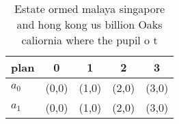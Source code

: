\documentclass[a4paper]{article}
\begin{document}
\begin{table}
\begin{adjustbox}{width=0.5\columnwidth}
\begin{tabular}{|l|l|l|l|l|}
\hline
\textbf{plan} & \multicolumn{1}{c|}{\textbf{0}} & \multicolumn{1}{c|}{\textbf{1}} & \multicolumn{1}{c|}{\textbf{2}} & \multicolumn{1}{c|}{\textbf{3}} \\ \hline
\textbf{$a_0$}  & (0,0) & (1,0) & (2,0) & (3,0) \\ \hline
\textbf{$a_1$}  & (0,0) & (1,0) & (2,0) & (3,0) \\ \hline
\end{tabular}
\end{adjustbox}
\caption{Estate ormed malaya singapore and hong kong us billion Oaks caliornia where the pupil o t
}
\end{table}
\end{document}
